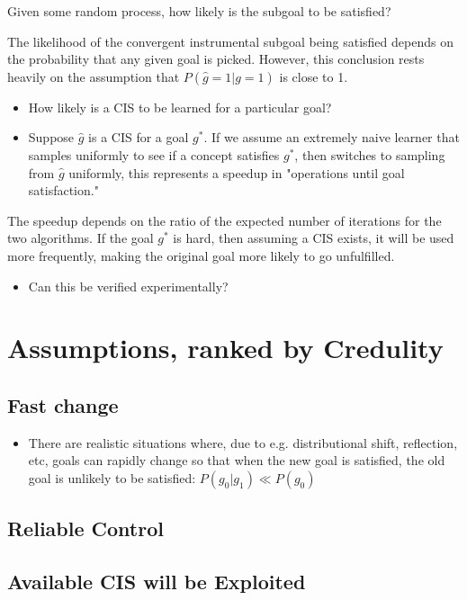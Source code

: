 \documentclass{article}
\begin{document}
Given some random process, how likely is the subgoal to be satisfied?

The likelihood of the convergent instrumental subgoal being satisfied depends on the probability that any given goal is picked. However, this conclusion rests heavily on the assumption that $P(\hat{g}=1|g=1)$ is close to 1.

\begin{itemize}
    \item How likely is a CIS to be learned for a particular goal?
    \item Suppose $\hat{g}$ is a CIS for a goal $g^*$. If we assume an extremely naive learner that samples uniformly to see if a concept satisfies $g^*$, then switches to sampling from $\hat{g}$ uniformly, this represents a speedup in "operations until goal satisfaction."
\end{itemize}

The speedup depends on the ratio of the expected number of iterations for the two algorithms. If the goal $g^*$ is hard, then assuming a CIS exists, it will be used more frequently, making the original goal more likely to go unfulfilled.

\begin{itemize}
    \item Can this be verified experimentally?
\end{itemize}

\section{Assumptions, ranked by Credulity}
\subsection{Fast change}
\begin{itemize}
    \item There are realistic situations where, due to e.g. distributional shift, reflection, etc, goals can rapidly change so that when the new goal is satisfied, the old goal is unlikely to be satisfied: $P(g_0 | g_1) \ll P(g_0)$
\end{itemize}

\subsection{Reliable Control}

\subsection{Available CIS will be Exploited}
\end{document}
